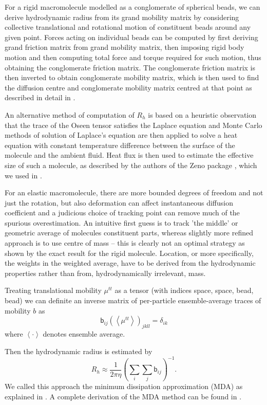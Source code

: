 \documentclass{doctoral}
\newcommand{\mm}[1]{\bm{\mathsf{#1}}} %
\begin{document}
For a rigid macromolecule modelled as a conglomerate of spherical beads, we can derive hydrodynamic radius from its grand mobility matrix by considering collective translational and rotational motion of constituent beads around any given point.
Forces acting on individual beads can be computed by first deriving grand friction matrix from grand mobility matrix, then imposing rigid body motion and then computing total force and torque required for such motion, thus obtaining the conglomerate friction matrix.
The conglomerate friction matrix is then inverted to obtain conglomerate mobility matrix, which is then used to find the diffusion centre and conglomerate mobility matrix centred at that point as described in detail in \textcite{Cichocki_2019}.

An alternative method of computation of $R_h$ is based on a heuristic observation that the trace of the Oseen tensor satisfies the Laplace equation and Monte Carlo methods of solution of Laplace's equation are then applied to solve a heat equation with constant temperature difference between the surface of the molecule and the ambient fluid.
Heat flux is then used to estimate the effective size of such a molecule, as described by the authors of the Zeno package \cite{Juba_2017}, which we used in \textcite{Waszkiewicz_2023_dna}.

For an elastic macromolecule, there are more bounded degrees of freedom and not just the rotation, but also deformation can affect instantaneous diffusion coefficient and a judicious choice of tracking point can remove much of the spurious overestimation.
An intuitive first guess is to track 'the middle' or geometric average of molecules constituent parts, whereas slightly more refined approach is to use centre of mass -- this is clearly not an optimal strategy as shown by the exact result for the rigid molecule.
Location, or more specifically, the weights in the weighted average, have to be derived from the hydrodynamic properties rather than from, hydrodynamically irrelevant, mass.

Treating translational mobility $\mm{\mu}^{tt}$ as a tensor (with indices space, space, bead, bead) we can definite an inverse matrix of per-particle ensemble-average traces of mobility $b$ as
\begin{equation}
    \mm{b}_{ij} \left(\left< \mm{\mu}^{tt} \right> \right)_{jkll} = \mm{\delta}_{ik}
\end{equation}
where $\left< \cdot \right>$ denotes ensemble average.

Then the hydrodynamic radius is estimated by
\begin{equation}
    R_h \approx \frac{1}{2 \pi \eta} \left( \sum_i \sum_j \mm{b}_{ij} \right)^{-1}.
\end{equation}
We called this approach the minimum dissipation approximation (MDA) as explained in \textcite{Waszkiewicz_2024_mda}.
A complete derivation of the MDA method can be found in \textcite{Cichocki_2019}.
\end{document}
